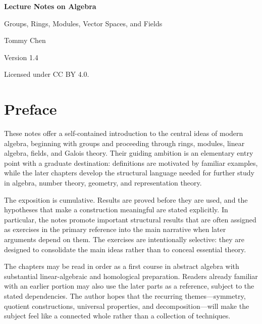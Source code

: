 \documentclass[11pt,oneside,openany]{book}
\theoremstyle{definition}
\theoremstyle{remark}
\begin{document}
\frontmatter
\hypersetup{pageanchor=false}
\begin{titlepage}
\centering
\vspace*{0.18\textheight}
{\Huge\bfseries Lecture Notes on Algebra\par}
\vspace{0.8em}
{\Large Groups, Rings, Modules, Vector Spaces, and Fields\par}
\vspace{2.25em}
{\Large Tommy Chen\par}
\vfill
{\large Version 1.4\par}
\vspace{0.45em}
{\small Licensed under CC BY 4.0.\par}
\end{titlepage}
\chapter*{Preface}
These notes offer a self-contained introduction to the central ideas of modern algebra, beginning with groups and proceeding through rings, modules, linear algebra, fields, and Galois theory.  Their guiding ambition is an elementary entry point with a graduate destination: definitions are motivated by familiar examples, while the later chapters develop the structural language needed for further study in algebra, number theory, geometry, and representation theory.

The exposition is cumulative.  Results are proved before they are used, and the hypotheses that make a construction meaningful are stated explicitly.  In particular, the notes promote important structural results that are often assigned as exercises in the primary reference into the main narrative when later arguments depend on them.  The exercises are intentionally selective: they are designed to consolidate the main ideas rather than to conceal essential theory.

The chapters may be read in order as a first course in abstract algebra with substantial linear-algebraic and homological preparation.  Readers already familiar with an earlier portion may also use the later parts as a reference, subject to the stated dependencies.  The author hopes that the recurring themes---symmetry, quotient constructions, universal properties, and decomposition---will make the subject feel like a connected whole rather than a collection of techniques.
\end{document}
